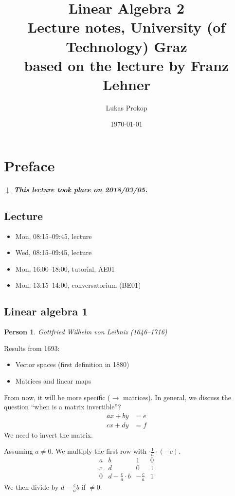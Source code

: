 \documentclass[a4paper]{article}
\title{
  Linear Algebra 2 \\
  \large{Lecture notes, University (of Technology) Graz} \\
  based on the lecture by Franz Lehner
}
\date{\today}
\author{Lukas Prokop}
\numberwithin{lecref}{section}
\newtheorem*{Person}{Person}
\newcommand{\dateref}[1]{%
  \begin{mdframed}[backgroundcolor=gray!10,innerbottommargin=0pt,innertopmargin=0pt]
    \paragraph{\textit{$\downarrow$ This lecture took place on #1.}}%
  \end{mdframed}%
}
\begin{document}
\maketitle
\tableofcontents

\section{Preface}
\dateref{2018/03/05}

\subsection{Lecture}

\begin{itemize}
  \item Mon, 08:15--09:45, lecture
  \item Wed, 08:15--09:45, lecture
  \item Mon, 16:00--18:00, tutorial, AE01
  \item Mon, 13:15--14:00, conversatorium (BE01)
\end{itemize}

\subsection{Linear algebra 1}

\begin{Person}
  Gottfried Wilhelm von Leibniz (1646--1716)
\end{Person}
Results from 1693:
\begin{itemize}
  \item Vector spaces (first definition in 1880)
  \item Matrices and linear maps
\end{itemize}
From now, it will be more specific ($\rightarrow$ matrices).
In general, we discuss the question \enquote{when is a matrix invertible}?
\begin{align*}
  ax + by &= e \\
  cx + dy &= f
\end{align*}
We need to invert the matrix.

Assuming $a \neq 0$. We multiply the first row with $\cdot \frac1a \cdot (-c)$.
\[
  \begin{array}{cc|cc}
    a & b & 1 & 0 \\
    c & d & 0 & 1 \\
  \hline
    0 & d-\frac ca \cdot b & -\frac ca & 1
  \end{array}
\]
We then divide by $d - \frac ca b$ if $\neq 0$.
\end{document}
